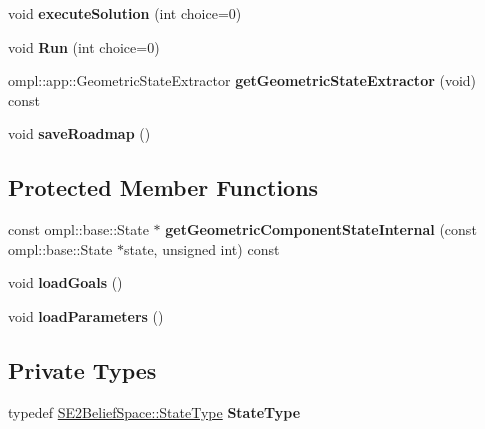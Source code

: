 \begin{DoxyCompactItemize}
\item 
\hypertarget{class_f_i_r_m_aruco2_d_r_o_s_setup_acd17d03bc02bd9b919490bbd8de018b4}{void {\bfseries execute\-Solution} (int choice=0)}\label{class_f_i_r_m_aruco2_d_r_o_s_setup_acd17d03bc02bd9b919490bbd8de018b4}

\item 
\hypertarget{class_f_i_r_m_aruco2_d_r_o_s_setup_a958e1c4e263e418a59a150a66ea02e4f}{void {\bfseries Run} (int choice=0)}\label{class_f_i_r_m_aruco2_d_r_o_s_setup_a958e1c4e263e418a59a150a66ea02e4f}

\item 
\hypertarget{class_f_i_r_m_aruco2_d_r_o_s_setup_a43957804db8bdac7b7883793455191e9}{ompl\-::app\-::\-Geometric\-State\-Extractor {\bfseries get\-Geometric\-State\-Extractor} (void) const }\label{class_f_i_r_m_aruco2_d_r_o_s_setup_a43957804db8bdac7b7883793455191e9}

\item 
\hypertarget{class_f_i_r_m_aruco2_d_r_o_s_setup_a654d420d6d9fb678040e3c1792910608}{void {\bfseries save\-Roadmap} ()}\label{class_f_i_r_m_aruco2_d_r_o_s_setup_a654d420d6d9fb678040e3c1792910608}

\end{DoxyCompactItemize}
\subsection*{Protected Member Functions}
\begin{DoxyCompactItemize}
\item 
\hypertarget{class_f_i_r_m_aruco2_d_r_o_s_setup_a8cebdfc59e6f3e83bb1b08ae7269b1d9}{const ompl\-::base\-::\-State $\ast$ {\bfseries get\-Geometric\-Component\-State\-Internal} (const ompl\-::base\-::\-State $\ast$state, unsigned int) const }\label{class_f_i_r_m_aruco2_d_r_o_s_setup_a8cebdfc59e6f3e83bb1b08ae7269b1d9}

\item 
\hypertarget{class_f_i_r_m_aruco2_d_r_o_s_setup_a41e3bafd7028ca7b2bde0deb25f0388a}{void {\bfseries load\-Goals} ()}\label{class_f_i_r_m_aruco2_d_r_o_s_setup_a41e3bafd7028ca7b2bde0deb25f0388a}

\item 
\hypertarget{class_f_i_r_m_aruco2_d_r_o_s_setup_a4af7401b7752c0801b736eba9b794b60}{void {\bfseries load\-Parameters} ()}\label{class_f_i_r_m_aruco2_d_r_o_s_setup_a4af7401b7752c0801b736eba9b794b60}

\end{DoxyCompactItemize}
\subsection*{Private Types}
\begin{DoxyCompactItemize}
\item 
\hypertarget{class_f_i_r_m_aruco2_d_r_o_s_setup_a404b795bd2bcd874ea5b09a496809851}{typedef \hyperlink{class_s_e2_belief_space_1_1_state_type}{S\-E2\-Belief\-Space\-::\-State\-Type} {\bfseries State\-Type}}\label{class_f_i_r_m_aruco2_d_r_o_s_setup_a404b795bd2bcd874ea5b09a496809851}

\end{DoxyCompactItemize}
